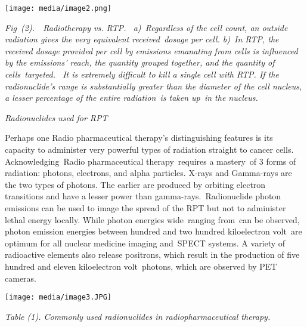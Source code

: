 \documentclass[
]{article}
\begin{document}
\texttt{[image: media/image2.png]}

\emph{Fig~(2).~~Radiotherapy vs. RTP.~ a)~Regardless of the cell count,
an outside radiation gives the very equivalent received~dosage per cell.
b)~In RTP, the received dosage provided per cell by emissions emanating
from cells is influenced by the emissions' reach, the quantity grouped
together, and the quantity of cells~targeted.~ It is extremely difficult
to kill a single cell with RTP. If the radionuclide's range is
substantially greater than the diameter of the cell nucleus, a lesser
percentage of the entire radiation~is taken up~in the nucleus.}

\emph{Radionuclides used for RPT}

Perhaps one Radio pharmaceutical therapy's distinguishing features is
its capacity to administer very powerful types of radiation straight to
cancer cells. Acknowledging~Radio pharmaceutical therapy~requires a
mastery~of 3 forms of radiation: photons, electrons, and alpha
particles. X-rays and Gamma-rays are the two types of photons. The
earlier are produced by orbiting electron transitions and have a lesser
power than gamma-rays.~Radionuclide photon emissions can be used to
image the spread of the RPT but not to administer lethal energy locally.
While photon energies wide~ranging from~can be observed, photon emission
energies between hundred and two hundred kiloelectron volt~are optimum
for all nuclear medicine imaging and~SPECT systems. A variety of
radioactive elements also release positrons, which result in the
production of five hundred and eleven kiloelectron volt~photons, which
are observed by PET cameras.

\texttt{[image: media/image3.JPG]}

\emph{Table (1). Commonly used radionuclides in radiopharmaceutical
therapy.}
\end{document}
